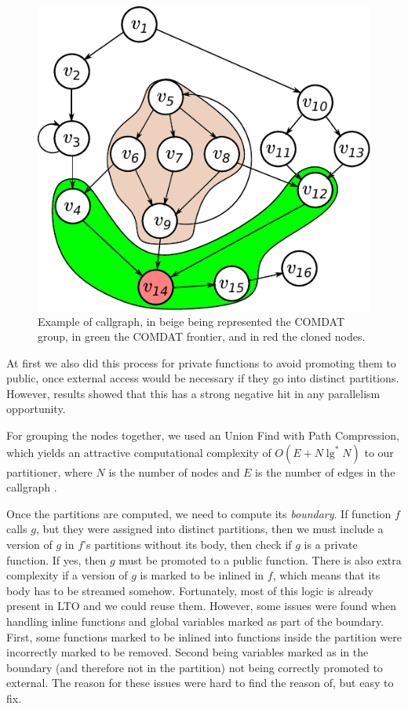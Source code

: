 \documentclass[runningheads]{llncs}
\begin{document}
\begin{figure}
\centering
	 \includegraphics[scale=0.7]{figuras/comdat_frontier.pdf}
	  \caption{Example of callgraph, in beige being represented the COMDAT group,
	  in green the COMDAT frontier, and in red the cloned nodes.}
	  \label{fig:comdat_frontier}
\end{figure}

At first we also did this process for private functions to avoid
promoting them to public, once external access would be necessary if they go
into distinct partitions. However, results showed that this has a strong
negative hit in any parallelism opportunity.

For grouping the nodes together,
we used an Union Find with Path Compression, which yields an attractive
computational complexity of $O(E + N \lg^*N)$ to our partitioner, where $N$ is the
number of nodes and $E$ is the number of edges in the callgraph \cite{feufiloff}.

Once the partitions are computed, we need to compute its \textit{boundary}.
If function $f$ calls $g$, but they were assigned into distinct partitions,
then we must include a version of $g$ in $f$'s partitions without its body,
then check if $g$ is a private function. If yes, then $g$ must be promoted
to a public function. There is also extra complexity if a version of $g$
is marked to be inlined in $f$, which means that its body has to be
streamed somehow. Fortunately, most of this logic is already present
in LTO and we could reuse them. However, some issues were found
when handling inline functions and global variables marked as part
of the boundary. First, some functions marked to be inlined into 
functions inside the partition were incorrectly marked to be removed.
Second being variables marked as in the boundary (and therefore
not in the partition) not being correctly promoted to external. The reason
for these issues were hard to find the reason of, but easy to fix.
\end{document}
